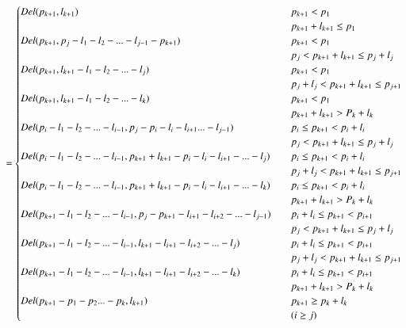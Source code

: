 \begin{equation}
= \begin{cases}
Del(p_{k+1},l_{k+1}) \quad &p_{k+1} < p_1 \quad \\ &p_{k+1}+l_{k+1} \le p_1 \\
Del(p_{k+1},p_j-l_1-l_2-...-l_{j-1}-p_{k+1}) \quad &p_{k+1} < p_1 \quad \\ &p_j < p_{k+1}+l_{k+1} \le p_j+l_j \\
Del(p_{k+1},l_{k+1}-l_1-l_2-...-l_j) \quad &p_{k+1} < p_1 \quad \\& p_j+l_j < p_{k+1}+l_{k+1} \le p_{j+1} \\
Del(p_{k+1},l_{k+1}-l_1-l_2-...-l_k) \quad &p_{k+1} < p_1 \quad \\& p_{k+1}+l_{k+1} > P_k+l_k  \\

Del(p_i-l_1-l_2-...-l_{i-1},p_j-p_i-l_i-l_{i+1}...-l_{j-1})        \quad &p_i \le p_{k+1} < p_i+l_i \quad \\ &p_j < p_{k+1}+l_{k+1} \le p_j+l_j \\
Del(p_i-l_1-l_2-...-l_{i-1},p_{k+1}+l_{k+1}-p_i-l_i-l_{i+1}-...-l_j) \quad &p_i \le p_{k+1} < p_i+l_i \quad \\& p_j+l_j < p_{k+1}+l_{k+1} \le p_{j+1} \\
Del(p_i-l_1-l_2-...-l_{i-1},p_{k+1}+l_{k+1}-p_i-l_i-l_{i+1}-...-l_k) \quad &p_i \le p_{k+1} < p_i+l_i \quad \\& p_{k+1}+l_{k+1} > P_k+l_k  \\


Del(p_{k+1}-l_1-l_2-...-l_{i-1},p_j-p_{k+1}-l_{i+1}-l_{i+2}-...-l_{j-1})    \quad &p_i+l_i \le p_{k+1} < p_{i+1} \quad \\& p_j < p_{k+1}+l_{k+1} \le p_j+l_j \\
Del(p_{k+1}-l_1-l_2-...-l_{i-1},l_{k+1}-l_{i+1}-l_{i+2}-...-l_j)    \quad &p_i+l_i \le p_{k+1} < p_{i+1} \quad \\& p_j+l_j < p_{k+1}+l_{k+1} \le p_{j+1} \\
Del(p_{k+1}-l_1-l_2-...-l_{i-1},l_{k+1}-l_{i+1}-l_{i+2}-...-l_k)    \quad &p_i+l_i \le p_{k+1} < p_{i+1} \quad \\& p_{k+1}+l_{k+1} > P_k+l_k  \\
Del(p_{k+1}-p_1-p_2...-p_k,l_{k+1}) \quad &p_{k+1} \ge p_k+l_k
\\&(i \ge j)
 \end{cases}\\
\end{equation}

